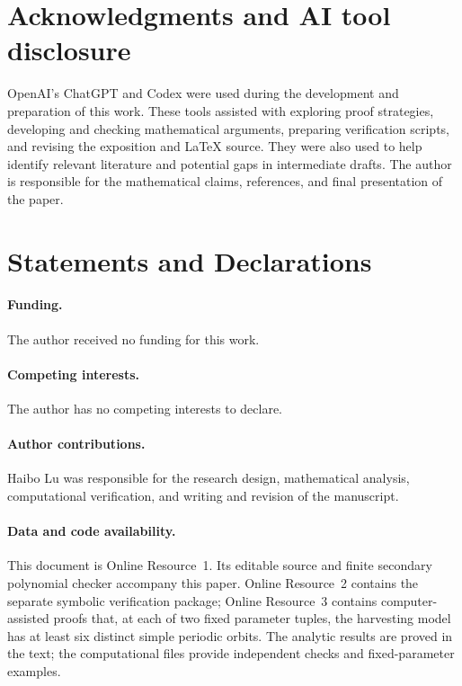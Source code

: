 \section*{Acknowledgments and AI tool disclosure}

OpenAI’s ChatGPT and Codex were used during the development and preparation of this work. These tools assisted with exploring proof strategies, developing and checking mathematical arguments, preparing verification scripts, and revising the exposition and LaTeX source. They were also used to help identify relevant literature and potential gaps in intermediate drafts. The author is responsible for the mathematical claims, references, and final presentation of the paper.

\section*{Statements and Declarations}

\paragraph{Funding.}
The author received no funding for this work.

\paragraph{Competing interests.}
The author has no competing interests to declare.

\paragraph{Author contributions.}
Haibo Lu was responsible for the research design, mathematical analysis,
computational verification, and writing and revision of the manuscript.

\paragraph{Data and code availability.}
This document is Online Resource~1. Its editable source and finite secondary
polynomial checker accompany this paper. Online Resource~2
contains the separate symbolic verification package; Online Resource~3
contains computer-assisted proofs that, at each of two fixed parameter tuples, the
harvesting model has at least six distinct simple periodic orbits.
The analytic results are proved in the text; the computational files
provide independent checks and fixed-parameter examples.
